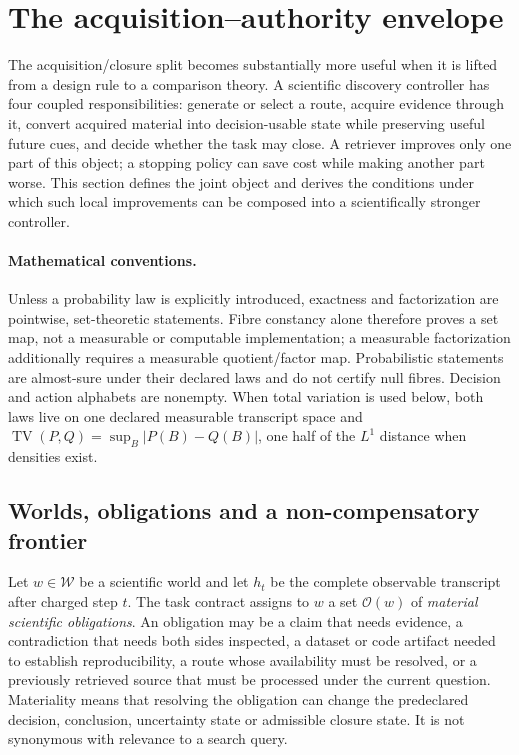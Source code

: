\section{The acquisition--authority envelope}
\label{sec:envelope}

The acquisition/closure split becomes substantially more useful when it is
lifted from a design rule to a comparison theory.  A scientific discovery
controller has four coupled responsibilities: generate or select a route,
acquire evidence through it, convert acquired material into decision-usable
state while preserving useful future cues, and decide whether the task may
close.  A retriever improves only one part of this object; a stopping policy can
save cost while making another part worse.  This section defines the joint
object and derives the conditions under which such local improvements can be
composed into a scientifically stronger controller.

\paragraph{Mathematical conventions.}
Unless a probability law is explicitly introduced, exactness and
factorization are pointwise, set-theoretic statements. Fibre constancy alone
therefore proves a set map, not a measurable or computable implementation; a
measurable factorization additionally requires a measurable quotient/factor
map. Probabilistic statements are almost-sure under their declared laws and do
not certify null fibres. Decision and action alphabets are nonempty. When total
variation is used below, both laws live on one declared measurable transcript
space and
$\operatorname{TV}(P,Q)=\sup_{B}|P(B)-Q(B)|$, one half of the $L^1$ distance
when densities exist.

\subsection{Worlds, obligations and a non-compensatory frontier}

Let $w\in\mathcal W$ be a scientific world and let $h_t$ be the complete
observable transcript after charged step $t$.  The task contract assigns to
$w$ a set $\mathcal O(w)$ of \emph{material scientific obligations}.  An
obligation may be a claim that needs evidence, a contradiction that needs both
sides inspected, a dataset or code artifact needed to establish reproducibility,
a route whose availability must be resolved, or a previously retrieved source
that must be processed under the current question.  Materiality means that
resolving the obligation can change the predeclared decision, conclusion,
uncertainty state or admissible closure state.  It is not synonymous with
relevance to a search query.

